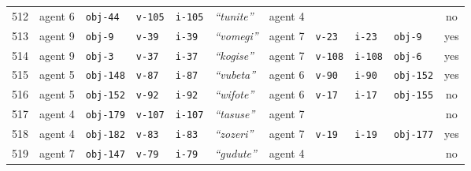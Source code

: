 {\begin{tabular}{@{}p{0.5cm}lp{1.2cm}p{1.2cm}p{1.2cm}llp{1.2cm}p{1.2cm}p{1.2cm}c@{}}
    512 & agent 6 & \texttt{obj-44} & \texttt{v-105} & \texttt{i-105} & \textit{``tunite''} & agent 4 & \texttt{} & \texttt{} & \texttt{} &  no \\
    513 & agent 9 & \texttt{obj-9} & \texttt{v-39} & \texttt{i-39} & \textit{``vomegi''} & agent 7 & \texttt{v-23} & \texttt{i-23} & \texttt{obj-9} &  yes \\
    514 & agent 9 & \texttt{obj-3} & \texttt{v-37} & \texttt{i-37} & \textit{``kogise''} & agent 7 & \texttt{v-108} & \texttt{i-108} & \texttt{obj-6} &  yes \\
    515 & agent 5 & \texttt{obj-148} & \texttt{v-87} & \texttt{i-87} & \textit{``vubeta''} & agent 6 & \texttt{v-90} & \texttt{i-90} & \texttt{obj-152} &  yes \\
    516 & agent 5 & \texttt{obj-152} & \texttt{v-92} & \texttt{i-92} & \textit{``wifote''} & agent 6 & \texttt{v-17} & \texttt{i-17} & \texttt{obj-155} &  no \\
    517 & agent 4 & \texttt{obj-179} & \texttt{v-107} & \texttt{i-107} & \textit{``tasuse''} & agent 7 & \texttt{} & \texttt{} & \texttt{} &  no \\
    518 & agent 4 & \texttt{obj-182} & \texttt{v-83} & \texttt{i-83} & \textit{``zozeri''} & agent 7 & \texttt{v-19} & \texttt{i-19} & \texttt{obj-177} &  yes \\
    519 & agent 7 & \texttt{obj-147} & \texttt{v-79} & \texttt{i-79} & \textit{``gudute''} & agent 4 & \texttt{} & \texttt{} & \texttt{} &  no \\
  \end{tabular}}



